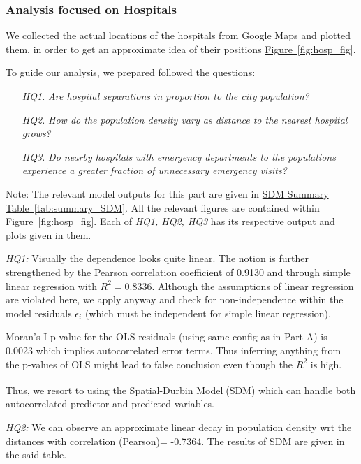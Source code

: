 \documentclass[
	a4paper, %
	10pt, %
	unnumberedsections, %
	twoside, %
]{LTJournalArticle}
\begin{document}
\subsubsection{Analysis focused on Hospitals}

We collected the actual locations of the hospitals from Google Maps and plotted them, in order to get an approximate idea of their positions \hyperref[fig:hosp_fig]{Figure~\ref{fig:hosp_fig}}.

To guide our analysis, we prepared followed the questions:
\begin{enumerate}
  \item[\textit{HQ1.}] \textit{Are hospital separations in proportion to the city population?}
  \item[\textit{HQ2.}] \textit{How do the population density vary as distance to the nearest hospital grows?}
  \item[\textit{HQ3.}] \textit{Do nearby hospitals with emergency departments to the populations experience a greater fraction of unnecessary emergency visits?}
\end{enumerate}

Note: The relevant model outputs for this part are given in \hyperref[tab:summary_SDM]{SDM Summary Table~\ref{tab:summary_SDM}}. All the relevant figures are contained within \hyperref[fig:hosp_fig]{Figure~\ref{fig:hosp_fig}}. Each of \textit{HQ1, HQ2, HQ3} has its respective output and plots given in them.



\textit{HQ1:} Visually the dependence looks quite linear. The notion is further strengthened by the Pearson correlation coefficient of 0.9130 and through simple linear regression with $R^2=0.8336$. Although the assumptions of linear regression are violated here, we apply anyway and check for non-independence within the model residuals $\epsilon_i$ (which must be independent for simple linear regression). 

Moran's I p-value for the OLS residuals (using same config as in Part A) is 0.0023 which implies autocorrelated error terms. Thus inferring anything from the p-values of OLS might lead to false conclusion even though the $R^2$ is high.

Thus, we resort to using the Spatial-Durbin Model\textsuperscript{\cite{atikah2021efficiency} \cite{Anselin1988} \cite{doi:10.1080/17421770601009841}} (SDM) which can handle both autocorrelated predictor and predicted variables.


\textit{HQ2:} We can observe an approximate linear decay in population density wrt the distances with correlation (Pearson)= -0.7364. The results of SDM are given in the said table.
\end{document}
